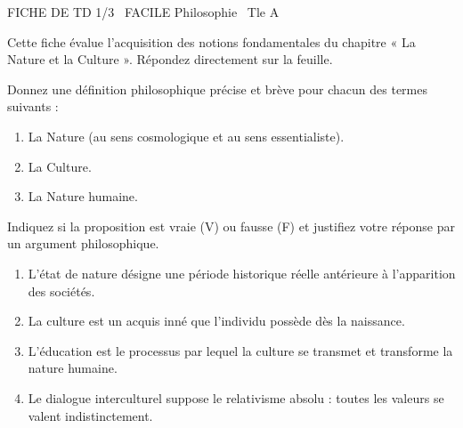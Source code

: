 \documentclass[11pt]{article}
\begin{document}
\begin{tcolorbox}[enhanced,colback=popink,colframe=popink,arc=10pt,boxrule=0pt,left=12pt,right=12pt,top=9pt,bottom=9pt]
{\color{white}\popxbold\small FICHE DE TD 1/3 \textbullet\ FACILE \hfill Philosophie \textbullet\ Tle A\par}
\end{tcolorbox}
\vspace{4pt}
Cette fiche évalue l'acquisition des notions fondamentales du chapitre « La Nature et la Culture ». Répondez directement sur la feuille.

\begin{exercice}
Donnez une définition philosophique précise et brève pour chacun des termes suivants :
\begin{enumerate}
    \item La Nature (au sens cosmologique et au sens essentialiste).
    \item La Culture.
    \item La Nature humaine.
\end{enumerate}
\end{exercice}

\begin{exercice}
Indiquez si la proposition est vraie (V) ou fausse (F) et justifiez votre réponse par un argument philosophique.
\begin{enumerate}
    \item L'état de nature désigne une période historique réelle antérieure à l'apparition des sociétés.
    \item La culture est un acquis inné que l'individu possède dès la naissance.
    \item L'éducation est le processus par lequel la culture se transmet et transforme la nature humaine.
    \item Le dialogue interculturel suppose le relativisme absolu : toutes les valeurs se valent indistinctement.
\end{enumerate}
\end{exercice}
\end{document}
